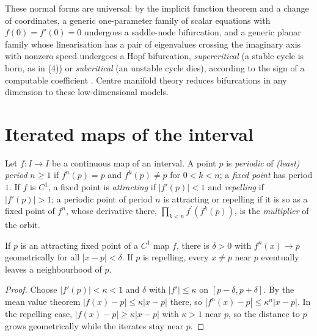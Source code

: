 These normal forms are universal: by the implicit function theorem and a change of coordinates, a generic one-parameter family of scalar equations with $f(0) = f'(0) = 0$ undergoes a saddle-node bifurcation, and a generic planar family
whose linearisation has a pair of eigenvalues crossing the imaginary axis with nonzero speed undergoes a Hopf bifurcation, \emph{supercritical} (a stable cycle is born, as in (4)) or \emph{subcritical} (an unstable cycle dies), according to
the sign of a computable coefficient \cite[Chapter 3]{guckenheimer-holmes}. Centre manifold theory reduces bifurcations in any dimension to these low-dimensional models.

\section{Iterated maps of the interval}\label{ordinary-differential-equations:section-one-dimensional}

\begin{definition}\label{ordinary-differential-equations:definition-periodic-point}
Let $f \colon I \to I$ be a continuous map of an interval. A point $p$ is \emph{periodic} of \emph{(least) period} $n \geq 1$ if $f^n(p) = p$ and $f^k(p) \neq p$ for $0 < k < n$; a \emph{fixed point} has period $1$. If $f$ is $C^1$, a fixed point is
\emph{attracting} if $|f'(p)| < 1$ and \emph{repelling} if $|f'(p)| > 1$; a periodic point of period $n$ is attracting or repelling if it is so as a fixed point of $f^n$, whose derivative there, $\prod_{k<n}f^{\prime}(f^k(p))$, is the
\emph{multiplier} of the orbit.
\end{definition}

\begin{proposition}\label{ordinary-differential-equations:proposition-attracting-fixed-point}
If $p$ is an attracting fixed point of a $C^1$ map $f$, there is $\delta > 0$ with $f^n(x) \to p$ geometrically for all $|x - p| < \delta$. If $p$ is repelling, every $x \neq p$ near $p$ eventually leaves a neighbourhood of $p$.
\end{proposition}

\begin{proof}
Choose $|f'(p)| < \kappa < 1$ and $\delta$ with $|f'| \leq \kappa$ on $[p - \delta, p + \delta]$. By the mean value theorem $|f(x) - p| \leq \kappa|x - p|$ there, so $|f^n(x) - p| \leq \kappa^n|x - p|$. In the repelling case, $|f(x) - p| \geq \kappa|x - p|$ with
$\kappa > 1$ near $p$, so the distance to $p$ grows geometrically while the iterates stay near $p$.
\end{proof}

